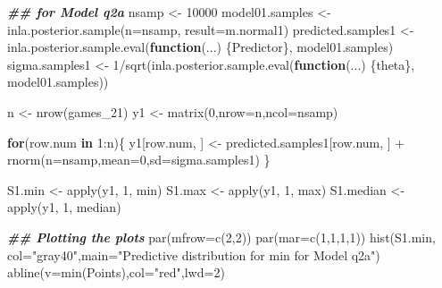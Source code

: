 \documentclass[
]{article}
\newenvironment{Shaded}{\begin{snugshade}}{\end{snugshade}}
\newcommand{\AttributeTok}[1]{\textcolor[rgb]{0.77,0.63,0.00}{#1}}
\newcommand{\ControlFlowTok}[1]{\textcolor[rgb]{0.13,0.29,0.53}{\textbf{#1}}}
\newcommand{\DecValTok}[1]{\textcolor[rgb]{0.00,0.00,0.81}{#1}}
\newcommand{\DocumentationTok}[1]{\textcolor[rgb]{0.56,0.35,0.01}{\textbf{\textit{#1}}}}
\newcommand{\FunctionTok}[1]{\textcolor[rgb]{0.00,0.00,0.00}{#1}}
\newcommand{\NormalTok}[1]{#1}
\newcommand{\OtherTok}[1]{\textcolor[rgb]{0.56,0.35,0.01}{#1}}
\newcommand{\SpecialCharTok}[1]{\textcolor[rgb]{0.00,0.00,0.00}{#1}}
\newcommand{\StringTok}[1]{\textcolor[rgb]{0.31,0.60,0.02}{#1}}
\begin{document}
\begin{Shaded}
\begin{Highlighting}[]
\DocumentationTok{\#\# for Model q2a}
\NormalTok{nsamp }\OtherTok{\textless{}{-}} \DecValTok{10000}
\NormalTok{model01.samples }\OtherTok{\textless{}{-}} \FunctionTok{inla.posterior.sample}\NormalTok{(}\AttributeTok{n=}\NormalTok{nsamp, }\AttributeTok{result=}\NormalTok{m.normal1)}
\NormalTok{predicted.samples1 }\OtherTok{\textless{}{-}} \FunctionTok{inla.posterior.sample.eval}\NormalTok{(}\ControlFlowTok{function}\NormalTok{(...) \{Predictor\}, model01.samples)}
\NormalTok{sigma.samples1 }\OtherTok{\textless{}{-}} \DecValTok{1}\SpecialCharTok{/}\FunctionTok{sqrt}\NormalTok{(}\FunctionTok{inla.posterior.sample.eval}\NormalTok{(}\ControlFlowTok{function}\NormalTok{(...) \{theta\}, model01.samples))}

\NormalTok{n }\OtherTok{\textless{}{-}} \FunctionTok{nrow}\NormalTok{(games\_21)}
\NormalTok{y1 }\OtherTok{\textless{}{-}} \FunctionTok{matrix}\NormalTok{(}\DecValTok{0}\NormalTok{,}\AttributeTok{nrow=}\NormalTok{n,}\AttributeTok{ncol=}\NormalTok{nsamp)}

\ControlFlowTok{for}\NormalTok{(row.num }\ControlFlowTok{in} \DecValTok{1}\SpecialCharTok{:}\NormalTok{n)\{ }
\NormalTok{   y1[row.num, ] }\OtherTok{\textless{}{-}}\NormalTok{ predicted.samples1[row.num, ] }\SpecialCharTok{+} \FunctionTok{rnorm}\NormalTok{(}\AttributeTok{n=}\NormalTok{nsamp,}\AttributeTok{mean=}\DecValTok{0}\NormalTok{,}\AttributeTok{sd=}\NormalTok{sigma.samples1)}
\NormalTok{\}}

\NormalTok{S1.min }\OtherTok{\textless{}{-}} \FunctionTok{apply}\NormalTok{(y1, }\DecValTok{1}\NormalTok{, min)}
\NormalTok{S1.max }\OtherTok{\textless{}{-}} \FunctionTok{apply}\NormalTok{(y1, }\DecValTok{1}\NormalTok{, max)}
\NormalTok{S1.median }\OtherTok{\textless{}{-}} \FunctionTok{apply}\NormalTok{(y1, }\DecValTok{1}\NormalTok{, median)}

\DocumentationTok{\#\# Plotting the plots}
\FunctionTok{par}\NormalTok{(}\AttributeTok{mfrow=}\FunctionTok{c}\NormalTok{(}\DecValTok{2}\NormalTok{,}\DecValTok{2}\NormalTok{))}
\FunctionTok{par}\NormalTok{(}\AttributeTok{mar=}\FunctionTok{c}\NormalTok{(}\DecValTok{1}\NormalTok{,}\DecValTok{1}\NormalTok{,}\DecValTok{1}\NormalTok{,}\DecValTok{1}\NormalTok{))}
\FunctionTok{hist}\NormalTok{(S1.min, }\AttributeTok{col=}\StringTok{"gray40"}\NormalTok{,}\AttributeTok{main=}\StringTok{"Predictive distribution for min for Model q2a"}\NormalTok{)}
\FunctionTok{abline}\NormalTok{(}\AttributeTok{v=}\FunctionTok{min}\NormalTok{(Points),}\AttributeTok{col=}\StringTok{"red"}\NormalTok{,}\AttributeTok{lwd=}\DecValTok{2}\NormalTok{)}


\end{Highlighting}
\end{Shaded}
\end{document}
